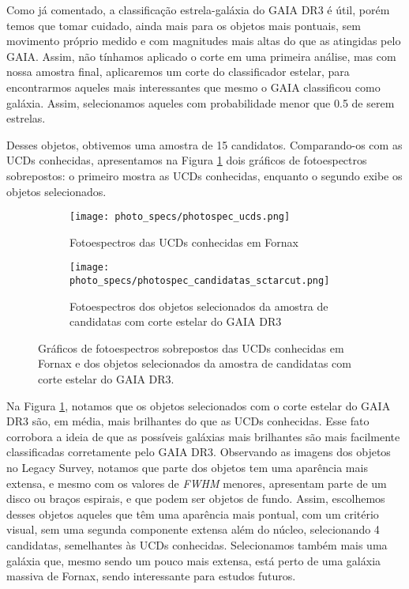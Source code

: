 Como já comentado, a classificação estrela-galáxia do GAIA DR3 é útil, porém temos que tomar cuidado, ainda mais para os objetos mais pontuais, sem movimento próprio medido e com magnitudes mais altas do que as atingidas pelo GAIA. Assim, não tínhamos aplicado o corte em uma primeira análise, mas com nossa amostra final, aplicaremos um corte do classificador estelar, para encontrarmos aqueles mais interessantes que mesmo o GAIA classificou como galáxia. Assim, selecionamos aqueles com probabilidade menor que 0.5 de serem estrelas.

Desses objetos, obtivemos uma amostra de 15 candidatos. Comparando-os com as UCDs conhecidas, apresentamos na Figura \ref{ucds_and_candiadates_star_cut_photospec} dois gráficos de fotoespectros sobrepostos: o primeiro mostra as UCDs conhecidas, enquanto o segundo exibe os objetos selecionados.

\begin{figure}[!ht]
    \centering
    \captionsetup{justification=centering}
    \begin{subfigure}[b]{0.95\textwidth}
        \texttt{[image: photo\_specs/photospec\_ucds.png]}
        \caption{Fotoespectros das UCDs conhecidas em Fornax}
    \end{subfigure}
    \begin{subfigure}[b]{0.95\textwidth}
        \texttt{[image: photo\_specs/photospec\_candidatas\_sctarcut.png]}
        \caption{Fotoespectros dos objetos selecionados da amostra de candidatas com corte estelar do GAIA DR3}
    \end{subfigure}
    \caption{Gráficos de fotoespectros sobrepostos das UCDs conhecidas em Fornax e dos objetos selecionados da amostra de candidatas com corte estelar do GAIA DR3.}
    \label{ucds_and_candiadates_star_cut_photospec}
\end{figure}

Na Figura \ref{ucds_and_candiadates_star_cut_photospec}, notamos que os objetos selecionados com o corte estelar do GAIA DR3 são, em média, mais brilhantes do que as UCDs conhecidas. Esse fato corrobora a ideia de que as possíveis galáxias mais brilhantes são mais facilmente classificadas corretamente pelo GAIA DR3. Observando as imagens dos objetos no Legacy Survey, notamos que parte dos objetos tem uma aparência mais extensa, e mesmo com os valores de \textit{FWHM} menores, apresentam parte de um disco ou braços espirais, e que podem ser objetos de fundo. Assim, escolhemos desses objetos aqueles que têm uma aparência mais pontual, com um critério visual, sem uma segunda componente extensa além do núcleo, selecionando 4 candidatas, semelhantes às UCDs conhecidas. Selecionamos também mais uma galáxia que, mesmo sendo um pouco mais extensa, está perto de uma galáxia massiva de Fornax, sendo interessante para estudos futuros.

